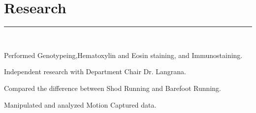 \documentclass[letterpaper]{deedy-resume} %
\begin{document}
\sectionspace %



\section{Research}
\normalfont
\hrule height .1pt \leavevmode \\
\vspace{2 mm}
\hfill
{}
\hfill
{}
\vspace{1 mm}
\begin{tightitemize}
	\item Performed Genotypeing,Hematoxylin and Eosin staining, and Immunostaining.
\end{tightitemize}		
\sectionspace %
\vspace{2 mm}

\hfill
{}
\hfill
{}
\vspace{1 mm}
\begin{tightitemize}
	\item Independent research with Department Chair Dr. Langrana.
	\item Compared the difference between Shod Running and Barefoot Running. 
	\item Manipulated and analyzed Motion Captured data. 
 \end{tightitemize}

\sectionspace %

\end{document}
